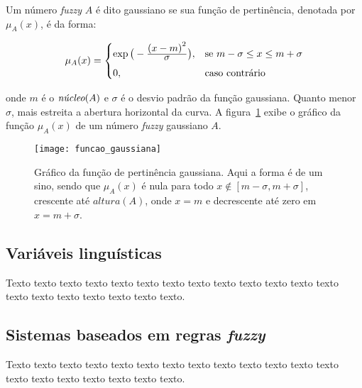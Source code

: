 \begin{defn}
\label{def:funcao_fuzzy_gaussiana}
Um número \emph{fuzzy} $A$ é dito gaussiano se sua função de pertinência, denotada por $\mu_{A}(x)$, é da forma:

\begin{equation}
  \mu_A(x) =  \begin{cases}
                \exp{\big(-\ensuremath{\frac{\displaystyle {(x - m)}^2}{\displaystyle \sigma}} \big)}, & \text{se}\ m - \sigma \leq x \leq m + \sigma\\[0.5em]
                0, & \text{caso contrário}
              \end{cases}
\end{equation}
\end{defn}
\noindent onde $m$ é o $\emph{núcleo}(A)$ e $\sigma$ é o desvio padrão da função gaussiana. Quanto menor $\sigma$, mais estreita a abertura horizontal da curva. A figura~\ref{fig:funcao_fuzzy_gaussiana} exibe o gráfico da função $\mu_A(x)$ de um número \emph{fuzzy} gaussiano $A$.

\begin{figure}[!h]
  \centering
  \texttt{[image: funcao\_gaussiana]}
  \caption[Gráfico da função de pertinência gaussiana]{Gráfico da função de pertinência gaussiana. Aqui a forma é de um sino, sendo que $\mu_A(x)$ é nula para todo $x \notin [m - \sigma, m + \sigma]$, crescente  até $altura(A)$, onde $x = m$ e decrescente até zero em $x = m + \sigma$.}
  \label{fig:funcao_fuzzy_gaussiana}
\end{figure}


\subsection{Variáveis linguísticas}
\label{sec:variaveis_linguisticas}
Texto texto texto texto texto texto texto texto texto texto texto texto texto
texto texto texto texto texto texto texto.


\subsection{Sistemas baseados em regras \emph{fuzzy}}
\label{sec:sistemas_regras_fuzzy}
Texto texto texto texto texto texto texto texto texto texto texto texto texto
texto texto texto texto texto texto texto.










